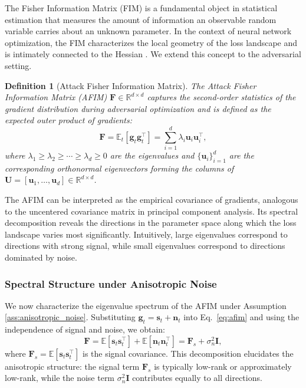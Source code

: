 \documentclass[preprint,12pt]{elsarticle}
\newtheorem{definition}{Definition}[section]
\begin{document}
The Fisher Information Matrix (FIM) is a fundamental object in statistical estimation that measures the amount of information an observable random variable carries about an unknown parameter. In the context of neural network optimization, the FIM characterizes the local geometry of the loss landscape and is intimately connected to the Hessian \cite{amari1998natural, martens2015optimizing}. We extend this concept to the adversarial setting.

\begin{definition}[Attack Fisher Information Matrix]
\label{def:afim}
The Attack Fisher Information Matrix (AFIM) $\mathbf{F} \in \mathbb{R}^{d \times d}$ captures the second-order statistics of the gradient distribution during adversarial optimization and is defined as the expected outer product of gradients:
\begin{equation}
\label{eq:afim}
\mathbf{F} = \mathbb{E}_{t}\left[ \mathbf{g}_t \mathbf{g}_t^\top \right] = \sum_{i=1}^{d} \lambda_i \mathbf{u}_i \mathbf{u}_i^\top,
\end{equation}
where $\lambda_1 \geq \lambda_2 \geq \cdots \geq \lambda_d \geq 0$ are the eigenvalues and $\{\mathbf{u}_i\}_{i=1}^{d}$ are the corresponding orthonormal eigenvectors forming the columns of $\mathbf{U} = [\mathbf{u}_1, \ldots, \mathbf{u}_d] \in \mathbb{R}^{d \times d}$.
\end{definition}

The AFIM can be interpreted as the empirical covariance of gradients, analogous to the uncentered covariance matrix in principal component analysis. Its spectral decomposition reveals the directions in the parameter space along which the loss landscape varies most significantly. Intuitively, large eigenvalues correspond to directions with strong signal, while small eigenvalues correspond to directions dominated by noise.

\subsubsection{Spectral Structure under Anisotropic Noise}

We now characterize the eigenvalue spectrum of the AFIM under Assumption \ref{ass:anisotropic_noise}. Substituting $\mathbf{g}_t = \mathbf{s}_t + \mathbf{n}_t$ into Eq.~\eqref{eq:afim} and using the independence of signal and noise, we obtain:
\begin{equation}
\label{eq:afim_decomposition}
\mathbf{F} = \mathbb{E}[\mathbf{s}_t \mathbf{s}_t^\top] + \mathbb{E}[\mathbf{n}_t \mathbf{n}_t^\top] = \mathbf{F}_s + \sigma_n^2 \mathbf{I},
\end{equation}
where $\mathbf{F}_s = \mathbb{E}[\mathbf{s}_t \mathbf{s}_t^\top]$ is the signal covariance. This decomposition elucidates the anisotropic structure: the signal term $\mathbf{F}_s$ is typically low-rank or approximately low-rank, while the noise term $\sigma_n^2 \mathbf{I}$ contributes equally to all directions.
\end{document}
